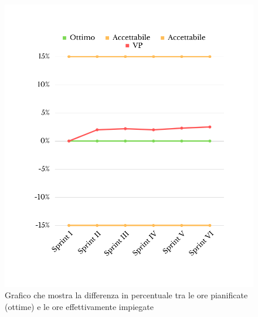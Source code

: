 \begin{figure}[H]
	\centering
	\includegraphics[scale=0.5]{img/SV.png}
	\caption{Grafico che mostra la differenza in percentuale tra le ore pianificate (ottime) e le ore effettivamente impiegate}
\end{figure}
